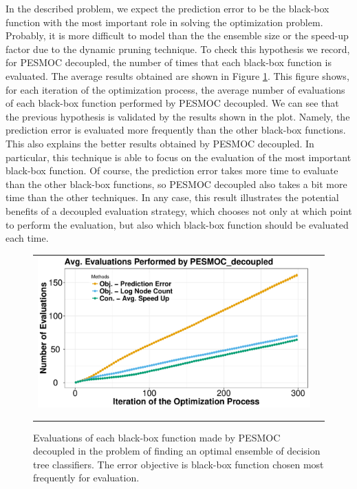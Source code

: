 In the described problem, we expect the prediction error to be the black-box function with the most important
role in solving the optimization problem. Probably, it is more difficult to model than the the ensemble
size or the speed-up factor due to the dynamic pruning technique. To check this hypothesis we record, for
PESMOC decoupled, the number of times that each black-box function is evaluated. The average results obtained are
shown in Figure \ref{fig:decoupled_ensemble}.
This figure shows, for each iteration of the optimization process, the average number of evaluations of each
black-box function performed by PESMOC decoupled.
We can see that the previous hypothesis is validated by the results shown in the plot.
Namely, the prediction error is evaluated more frequently than the other black-box functions. This also explains
the better results obtained by PESMOC decoupled. In particular, this technique is able to focus on the evaluation of
the most important black-box function. Of course, the prediction error takes more time to evaluate than the
other black-box functions, so PESMOC decoupled also takes a bit more time than the other techniques. In any case,
this result illustrates the potential benefits of a decoupled evaluation strategy, which chooses not only at which
point to perform the evaluation, but also which black-box function should be evaluated each time.

\begin{figure}[htb]
\begin{center}
        \begin{tabular}{cc}
                \vspace{-.2cm}
                \includegraphics[width=0.75\linewidth]{Figures/pesmoc/real/plot_ensemble_counter.pdf} \\ \\
                \vspace{-.1cm}
        \end{tabular}
        \caption{Evaluations of each black-box function made by PESMOC decoupled in the problem of finding an optimal
        ensemble of decision tree classifiers. The error objective is black-box function chosen most frequently for evaluation.}
        \label{fig:decoupled_ensemble}
\end{center}
\end{figure}

